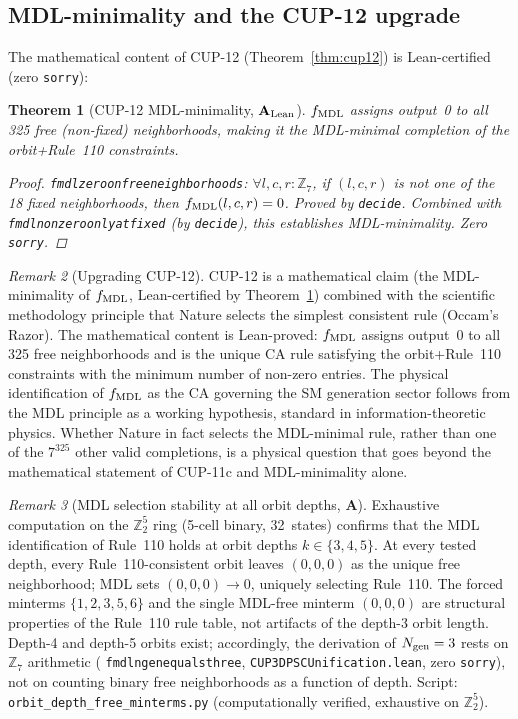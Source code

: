 \documentclass[11pt]{article}
\newtheorem{theorem}{Theorem}[section]
\theoremstyle{remark}
\newtheorem{remark}[theorem]{Remark}
\newcommand{\lean}[1]{%
  \penalty-100
  \begingroup\def\_{\textunderscore\allowbreak}\texttt{#1}\endgroup}
\newcommand{\CatA}{\textbf{A}}
\newcommand{\CatAL}{\ensuremath{\textbf{A}_{\rm Lean}}}
\begin{document}
\subsection{MDL-minimality and the CUP-12 upgrade}

The mathematical content of CUP-12 (Theorem~\ref{thm:cup12}) is Lean-certified (zero \texttt{sorry}):

\begin{theorem}[CUP-12 MDL-minimality, $\CatAL$]
\label{thm:cup12_mdl}
$f_{\rm MDL}$ assigns output~0 to all 325 free (non-fixed) neighborhoods, making it
the MDL-minimal completion of the orbit+Rule~110 constraints.
\begin{proof}
\lean{fmdl\_zero\_on\_free\_neighborhoods}: $\forall l,c,r : \mathbb{Z}_7$, if
$(l,c,r)$ is not one of the 18 fixed neighborhoods, then $f_{\rm MDL}(l,c,r) = 0$.
Proved by \lean{decide}. Combined with \lean{fmdl\_nonzero\_only\_at\_fixed}
(by \lean{decide}), this establishes MDL-minimality. Zero \texttt{sorry}.
\end{proof}
\end{theorem}

\begin{remark}[Upgrading CUP-12]
CUP-12 is a mathematical claim (the MDL-minimality of $f_{\rm MDL}$, Lean-certified by
Theorem~\ref{thm:cup12_mdl}) combined with the scientific methodology principle that
Nature selects the simplest consistent rule (Occam's Razor).
The mathematical content is Lean-proved: $f_{\rm MDL}$ assigns output~0 to all 325 free
neighborhoods and is the unique CA rule satisfying the orbit+Rule~110 constraints with
the minimum number of non-zero entries.
The physical identification of $f_{\rm MDL}$ as the CA governing the SM generation sector
follows from the MDL principle as a working hypothesis, standard in information-theoretic
physics. Whether Nature in fact selects the MDL-minimal rule, rather than one of the
$7^{325}$ other valid completions, is a physical question that goes beyond the mathematical
statement of CUP-11c and MDL-minimality alone.
\end{remark}

\begin{remark}[MDL selection stability at all orbit depths, $\CatA$]
\label{rem:mdl_depth_stability}
Exhaustive computation on the $\mathbb{Z}_2^5$ ring (5-cell binary, 32~states) confirms
that the MDL identification of Rule~110 holds at orbit depths $k \in \{3,4,5\}$.
At every tested depth, every Rule~110-consistent orbit leaves $(0,0,0)$ as the unique
free neighborhood; MDL sets $(0,0,0)\!\to\!0$, uniquely selecting Rule~110.
The forced minterms $\{1,2,3,5,6\}$ and the single MDL-free minterm $(0,0,0)$
are structural properties of the Rule~110 rule table, not artifacts of the
depth-3 orbit length.
Depth-4 and depth-5 orbits exist; accordingly, the derivation of $N_{\rm gen}=3$
rests on $\mathbb{Z}_7$ arithmetic (\lean{fmdl\_ngen\_equals\_three},
\lean{CUP3DPSCUnification.lean}, zero \texttt{sorry}), not on counting
binary free neighborhoods as a function of depth.
Script: \texttt{orbit\_depth\_free\_minterms.py} (computationally verified, exhaustive on $\mathbb{Z}_2^5$).
\end{remark}
\end{document}
